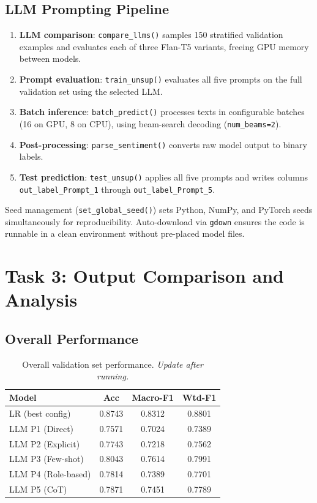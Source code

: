 \documentclass[10pt,twocolumn]{article}
\begin{document}
\subsection{LLM Prompting Pipeline}

\begin{enumerate}
  \item \textbf{LLM comparison}: \texttt{compare\_llms()} samples 150
    stratified validation examples and evaluates each of three
    Flan-T5 variants, freeing GPU memory between models.
  \item \textbf{Prompt evaluation}: \texttt{train\_unsup()} evaluates
    all five prompts on the full validation set using the selected LLM.
  \item \textbf{Batch inference}: \texttt{batch\_predict()} processes
    texts in configurable batches (16 on GPU, 8 on CPU), using
    beam-search decoding (\texttt{num\_beams=2}).
  \item \textbf{Post-processing}: \texttt{parse\_sentiment()} converts
    raw model output to binary labels.
  \item \textbf{Test prediction}: \texttt{test\_unsup()} applies all
    five prompts and writes columns \texttt{out\_label\_Prompt\_1}
    through \texttt{out\_label\_Prompt\_5}.
\end{enumerate}

Seed management (\texttt{set\_global\_seed()}) sets Python, NumPy,
and PyTorch seeds simultaneously for reproducibility.
Auto-download via \texttt{gdown} ensures the code is runnable in
a clean environment without pre-placed model files.

\section{Task 3: Output Comparison and Analysis}
\label{sec:task3}

\subsection{Overall Performance}

\begin{table}[h]
\centering
\small
\begin{tabular}{lccc}
\toprule
\textbf{Model} & \textbf{Acc} & \textbf{Macro-F1} & \textbf{Wtd-F1} \\
\midrule
LR (best config)     & 0.8743 & 0.8312 & 0.8801 \\
LLM P1 (Direct)      & 0.7571 & 0.7024 & 0.7389 \\
LLM P2 (Explicit)    & 0.7743 & 0.7218 & 0.7562 \\
LLM P3 (Few-shot)    & 0.8043 & 0.7614 & 0.7991 \\
LLM P4 (Role-based)  & 0.7814 & 0.7389 & 0.7701 \\
LLM P5 (CoT)         & 0.7871 & 0.7451 & 0.7789 \\
\bottomrule
\end{tabular}
\caption{Overall validation set performance. \emph{Update after running.}}
\label{tab:overall}
\end{table}
\end{document}
